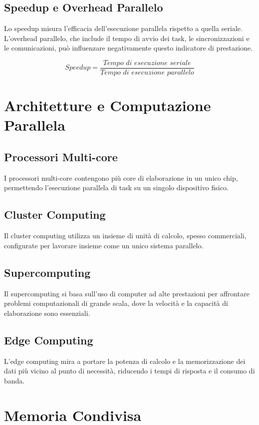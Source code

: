 \subsection{Speedup e Overhead Parallelo}
Lo speedup misura l'efficacia dell'esecuzione parallela rispetto a quella seriale. L'overhead parallelo, che include il tempo di avvio dei task, le sincronizzazioni e le comunicazioni, può influenzare negativamente questo indicatore di prestazione.

\[
    \textit{Speedup} = \frac{\textit{Tempo di esecuzione seriale}}{\textit{Tempo di esecuzione parallelo}}
\]

\section{Architetture e Computazione Parallela}

\subsection{Processori Multi-core}
I processori multi-core contengono più core di elaborazione in un unico chip, permettendo l'esecuzione parallela di task su un singolo dispositivo fisico.

\subsection{Cluster Computing}
Il cluster computing utilizza un insieme di unità di calcolo, spesso commerciali, configurate per lavorare insieme come un unico sistema parallelo.

\subsection{Supercomputing}
Il supercomputing si basa sull'uso di computer ad alte prestazioni per affrontare problemi computazionali di grande scala, dove la velocità e la capacità di elaborazione sono essenziali.

\subsection{Edge Computing}
L'edge computing mira a portare la potenza di calcolo e la memorizzazione dei dati più vicino al punto di necessità, riducendo i tempi di risposta e il consumo di banda.

\section{Memoria Condivisa}


